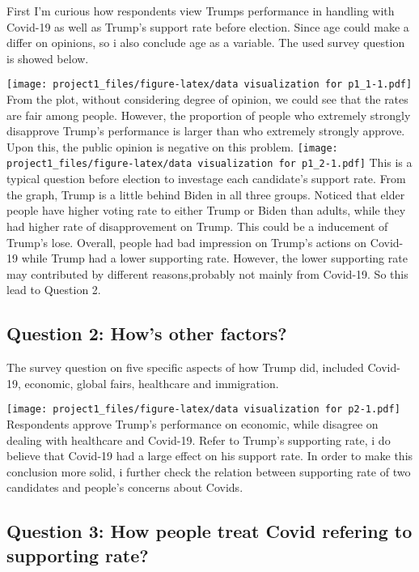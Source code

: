 \documentclass[
]{article}
\begin{document}
First I'm curious how respondents view Trumps performance in handling
with Covid-19 as well as Trump's support rate before election. Since age
could make a differ on opinions, so i also conclude age as a variable.
The used survey question is showed below.

\texttt{[image: project1\_files/figure-latex/data visualization for p1\_1-1.pdf]}
From the plot, without considering degree of opinion, we could see that
the rates are fair among people. However, the proportion of people who
extremely strongly disapprove Trump's performance is larger than who
extremely strongly approve. Upon this, the public opinion is negative on
this problem.
\texttt{[image: project1\_files/figure-latex/data visualization for p1\_2-1.pdf]}
This is a typical question before election to investage each candidate's
support rate. From the graph, Trump is a little behind Biden in all
three groups. Noticed that elder people have higher voting rate to
either Trump or Biden than adults, while they had higher rate of
disapprovement on Trump. This could be a inducement of Trump's lose.
Overall, people had bad impression on Trump's actions on Covid-19 while
Trump had a lower supporting rate. However, the lower supporting rate
may contributed by different reasons,probably not mainly from Covid-19.
So this lead to Question 2.

\hypertarget{question-2-hows-other-factors}{%
\subsection{Question 2: How's other
factors?}\label{question-2-hows-other-factors}}

The survey question on five specific aspects of how Trump did, included
Covid-19, economic, global fairs, healthcare and immigration.

\texttt{[image: project1\_files/figure-latex/data visualization for p2-1.pdf]}
Respondents approve Trump's performance on economic, while disagree on
dealing with healthcare and Covid-19. Refer to Trump's supporting rate,
i do believe that Covid-19 had a large effect on his support rate. In
order to make this conclusion more solid, i further check the relation
between supporting rate of two candidates and people's concerns about
Covids.

\hypertarget{question-3-how-people-treat-covid-refering-to-supporting-rate}{%
\subsection{Question 3: How people treat Covid refering to supporting
rate?}\label{question-3-how-people-treat-covid-refering-to-supporting-rate}}
\end{document}
